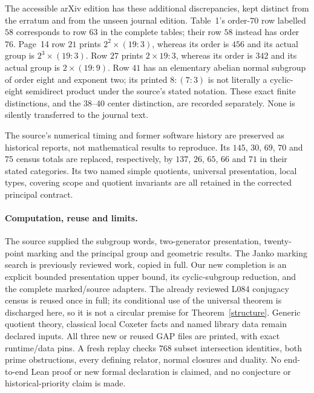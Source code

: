 \documentclass[11pt,a4paper]{article}
\begin{document}
The accessible arXiv edition has these additional discrepancies, kept distinct from the erratum and from the unseen journal edition. Table~1's order-$70$ row labelled $58$ corresponds to row $63$ in the complete tables; their row $58$ instead has order $76$. Page~14 row $21$ prints $2^2\times(19:3)$, whereas its order is $456$ and its actual group is $2^3\times(19:3)$. Row $27$ prints $2\times19:3$, whereas its order is $342$ and its actual group is $2\times(19:9)$. Row $41$ has an elementary abelian normal subgroup of order eight and exponent two; its printed $8:(7:3)$ is not literally a cyclic-eight semidirect product under the source's stated notation. These exact finite distinctions, and the $38$--$40$ center distinction, are recorded separately. None is silently transferred to the journal text.

The source's numerical timing and former software history are preserved as historical reports, not mathematical results to reproduce. Its $145$, $30$, $69$, $70$ and $75$ census totals are replaced, respectively, by $137$, $26$, $65$, $66$ and $71$ in their stated categories. Its two named simple quotients, universal presentation, local types, covering scope and quotient invariants are all retained in the corrected principal contract.

\paragraph{Computation, reuse and limits.}
The source supplied the subgroup words, two-generator presentation, twenty-point marking and the principal group and geometric results. The Janko marking search is previously reviewed work, copied in full. Our new completion is an explicit bounded presentation upper bound, its cyclic-subgroup reduction, and the complete marked/source adapters. The already reviewed L084 conjugacy census is reused once in full; its conditional use of the universal theorem is discharged here, so it is not a circular premise for Theorem~\ref{structure}. Generic quotient theory, classical local Coxeter facts and named library data remain declared inputs. All three new or reused GAP files are printed, with exact runtime/data pins. A fresh replay checks $768$ subset intersection identities, both prime obstructions, every defining relator, normal closures and duality. No end-to-end Lean proof or new formal declaration is claimed, and no conjecture or historical-priority claim is made.
\end{document}
